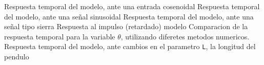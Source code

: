 \documentclass{ieeeaccess}
\begin{document}
\begin{appendices}

       {Respuesta temporal del modelo, ante una entrada
        cosenoidal\label{fig:cos}}
       {Respuesta temporal del modelo, ante una señal
       sinusoidal\label{fig:sin}}
       {Respuesta temporal del modelo, ante una señal
       tipo sierra\label{fig:rep}}
       {Respuesta al impulso (retardado) modelo\label{fig:rep}}
       {Comparacion de la respuesta temporal para la variable $\theta$,
         utilizando diferetes metodos numericos.\label{fig:nmth}}
	   {Respuesta temporal del modelo, ante cambios en el parametro \texttt{L}, la longitud del pendulo\label{fig:var-len}}
\end{appendices}


\EOD{}
\end{document}
